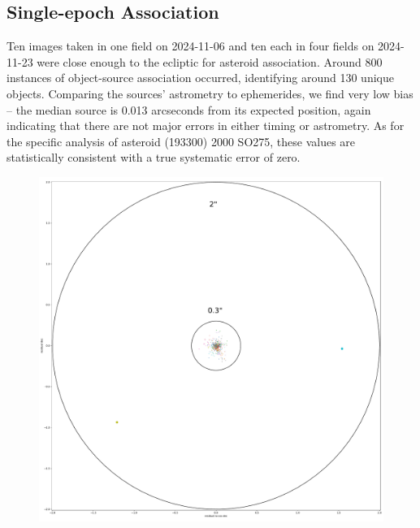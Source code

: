 \subsection{Single-epoch Association}
\label{sec:association}

Ten images taken in one field on 2024-11-06 and ten each in four fields on 2024-11-23 were close enough to the ecliptic for asteroid association. Around 800 instances of object-source association occurred, identifying around 130 unique objects. Comparing the sources' astrometry to ephemerides, we find very low bias -- the median source is 0.013 arcseconds from its expected position, again indicating that there are not major errors in either timing or astrometry. As for the specific analysis of asteroid (193300) 2000 SO275, these values are statistically consistent with a true systematic error of zero.

\begin{figure}
  \label{fig:solar_system_residuals}
  \includegraphics{sso_figures/sso_residuals.pdf}
  \caption{}
\end{figure}
